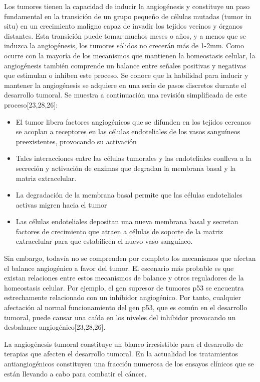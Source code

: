 \hspace{.1cm}Los tumores tienen la capacidad de inducir la angiogénesis y constituye un paso fundamental en la transición de un grupo pequeño de células mutadas (tumor in situ) en un crecimiento maligno capaz de invadir los tejidos vecinos y órganos distantes. Esta transición puede tomar muchos meses o años, y a menos que se induzca la angiogénesis, los tumores sólidos no crecerán más de 1-2mm. Como ocurre con la mayoría de los mecanismos que mantienen la homeostasis celular, la angiogénesis también comprende un balance entre señales positivas y negativas que estimulan o inhiben este proceso. Se conoce que la habilidad para inducir y mantener la angiogénesis se adquiere en una serie de pasos discretos durante el desarrollo tumoral. Se muestra a continuación una revisión simplificada de este proceso[23,28,26]:
\begin{itemize}
    \item El tumor libera factores angiogénicos que se difunden en los tejidos cercanos se acoplan a receptores en las células endoteliales de los vasos sanguíneos preexistentes, provocando su activación
    \item Tales interacciones entre las células tumorales y las endoteliales conlleva a la secreción y activación de enzimas que degradan la membrana basal y la matriz extracelular.
    \item La degradación de la membrana basal permite que las células endoteliales activas migren hacia el tumor
    \item Las células endoteliales depositan una nueva membrana basal y secretan factores de crecimiento que atraen a células de soporte de la matriz extracelular para que estabilicen el nuevo vaso sanguíneo.
\end{itemize}

Sin embargo, todavía no se comprenden por completo los mecanismos que afectan el balance angiogénico a favor del tumor. El escenario más probable es que existan relaciones entre estos mecanismos de balance y otros reguladores de la homeostasis celular. Por ejemplo, el gen supresor de tumores p53 se encuentra estrechamente relacionado con un inhibidor angiogénico. Por tanto, cualquier afectación al normal funcionamiento del gen p53, que es común en el desarrollo tumoral, puede causar una caída en los niveles del inhibidor provocando un desbalance angiogénico[23,28,26].

\hspace{.1cm}La angiogénesis tumoral constituye un blanco irresistible para el desarrollo de terapias que afecten el desarrollo tumoral. En la actualidad los tratamientos antiangiogénicos constituyen una fracción numerosa de los ensayos clínicos que se están llevando a cabo para combatir el cáncer.

